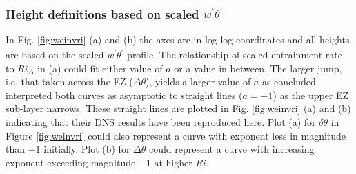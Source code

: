 \subsubsection{Height definitions based on scaled $\overline{w^{'}\theta^{'}}$}
In Fig. \ref{fig:weinvri} (a) and (b) the axes are in log-log coordinates and all heights are based on the scaled $\overline{w^{'}\theta^{'}}$ profile. The relationship of scaled entrainment rate to $Ri_{\Delta}$ in (a) could fit either value of $a$ or a value in between.  The larger jump, i.e. that taken across the EZ ($\Delta \theta$), yields a larger value of $a$ as \cite{FedConzMir04} concluded.  \cite{GarciaMellado} interpreted both curves as asymptotic to straight lines ($a=-1$) as the upper EZ sub-layer narrows.  These straight lines are plotted in Fig. \ref{fig:weinvri} (a) and (b) indicating that their DNS results have been reproduced here.   Plot (a) for $\delta \theta$ in Figure \ref{fig:weinvri} could also represent a curve with exponent less in magnitude than $-1$ initially.  Plot (b) for $\Delta \theta$ could represent a curve with increasing exponent exceeding magnitude $-1$ at higher $Ri$.\\

